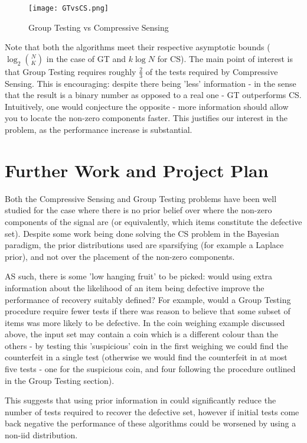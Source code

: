 \begin{figure*}[h]
\centering
\texttt{[image: GTvsCS.png]}
\caption{Group Testing vs Compressive Sensing}
\label{GTvsCS} 
\end{figure*}

Note that both the algorithms meet their respective asymptotic bounds (\( \log_2{N \choose K}\) in the case of GT and \(k\log{N}\) for CS). The main point of interest is that Group Testing requires roughly \(\frac{2}{3}\) of the tests required by Compressive Sensing. This is encouraging: despite there being 'less' information - in the sense that the result is a binary number as opposed to a real one -  GT outperforms CS. Intuitively, one would conjecture the opposite - more information should allow you to locate the non-zero components faster. This justifies our interest in the problem, as the performance increase is substantial. 

\section{Further Work and Project Plan}
Both the Compressive Sensing and Group Testing problems have been well studied for the case where there is no prior belief over where the non-zero components of the signal are (or equivalently, which items constitute the defective set). Despite some work being done solving the CS problem in the Bayesian paradigm, the prior distributions used are sparsifying (for example a Laplace prior), and not over the placement of the non-zero components. 

AS such, there is some 'low hanging fruit' to be picked: would using extra information about the likelihood of an item being defective improve the performance of recovery suitably defined? For example, would a Group Testing procedure require fewer tests if there was reason to believe that some subset of items was more likely to be defective. In the coin weighing example discussed above, the input set may contain a coin which is a different colour than the others  - by testing this 'suspicious' coin in the first weighing we could find the counterfeit in a single test (otherwise we would find the counterfeit in at most five tests - one for the suspicious coin, and four following the procedure outlined in the Group Testing section). 

This suggests that using prior information in could significantly reduce the number of tests required to recover the defective set, however if initial tests come back negative the performance of these algorithms could be worsened by using a non-iid distribution. 


